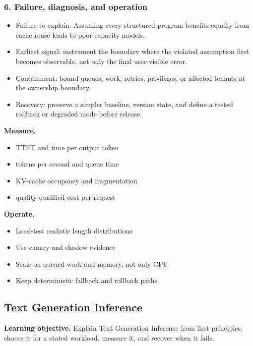 \subsubsection*{6. Failure, diagnosis, and operation}
\begin{itemize}
\item Failure to explain: Assuming every structured program benefits equally from cache reuse leads to poor capacity models.
\item Earliest signal: instrument the boundary where the violated assumption first becomes observable, not only the final user-visible error.
\item Containment: bound queues, work, retries, privileges, or affected tenants at the ownership boundary.
\item Recovery: preserve a simpler baseline, version state, and define a tested rollback or degraded mode before release.
\end{itemize}
\textbf{Measure.}\begin{itemize}
\item TTFT and time per output token
\item tokens per second and queue time
\item KV-cache occupancy and fragmentation
\item quality-qualified cost per request
\end{itemize}
\textbf{Operate.}\begin{itemize}
\item Load-test realistic length distributions
\item Use canary and shadow evidence
\item Scale on queued work and memory, not only CPU
\item Keep deterministic fallback and rollback paths
\end{itemize}
\subsection{Text Generation Inference}
\textbf{Learning objective.} Explain Text Generation Inference from first principles, choose it for a stated workload, measure it, and recover when it fails.
